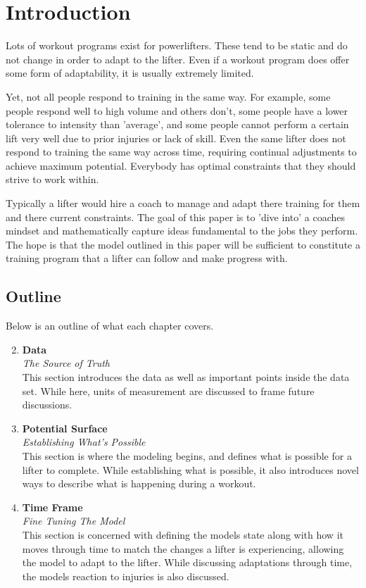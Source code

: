 \chapter{Introduction}
\label{sec:Introduction}

Lots of workout programs exist for powerlifters. These tend to be static and do not change in order to adapt to the lifter. Even if a workout program does offer some form of adaptability, it is usually extremely limited.

Yet, not all people respond to training in the same way. For example, some people respond well to high volume and others don't, some people have a lower tolerance to intensity than 'average', and some people cannot perform a certain lift very well due to prior injuries or lack of skill. Even the same lifter does not respond to training the same way across time, requiring continual adjustments to achieve maximum potential. Everybody has optimal constraints that they should strive to work within.

Typically a lifter would hire a coach to manage and adapt there training for them and there current constraints. The goal of this paper is to 'dive into' a coaches mindset and mathematically capture ideas fundamental to the jobs they perform. The hope is that the model outlined in this paper will be sufficient to constitute a training program that a lifter can follow and make progress with.

\section{Outline}

Below is an outline of what each chapter covers.

\begin{enumerate}
    \setcounter{enumi}{1}
    \item \textbf{Data} \\ \textit{The Source of Truth} \\
        This section introduces the data as well as important points inside the data set. While here, units of measurement are discussed to frame future discussions.
    \item \textbf{Potential Surface} \\ \textit{Establishing What's Possible} \\
        This section is where the modeling begins, and defines what is possible for a lifter to complete. While establishing what is possible, it also introduces novel ways to describe what is happening during a workout.
    \item \textbf{Time Frame} \\ \textit{Fine Tuning The Model} \\
        This section is concerned with defining the models state along with how it moves through time to match the changes a lifter is experiencing, allowing the model to adapt to the lifter. While discussing adaptations through time, the models reaction to injuries is also discussed.
\end{enumerate}

